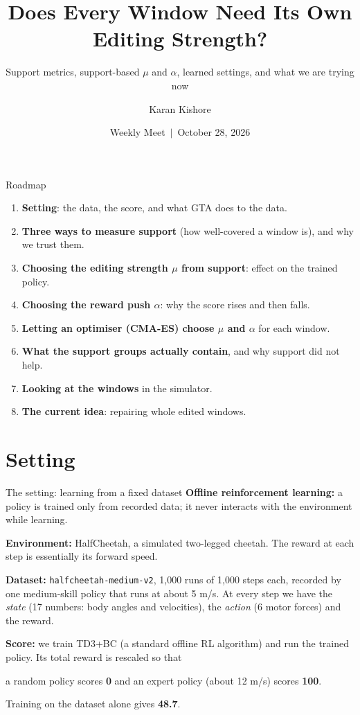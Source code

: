 \documentclass[aspectratio=169,10pt]{beamer}
\title[support metrics $\rightarrow$ per-window $\mu$ and $\alpha$ $\rightarrow$ current idea]{Does Every Window Need Its Own Editing Strength?}
\subtitle{Support metrics, support-based $\mu$ and $\alpha$, learned settings, and what we are trying now}
\author{Karan Kishore}
\institute{IIT Madras}
\date{Weekly Meet \,$|$\, October 28, 2026}
\begin{document}
\begin{frame}
\titlepage
\end{frame}

\begin{frame}{Roadmap}
\begin{enumerate}
\item \textbf{Setting}: the data, the score, and what GTA does to the data.
\item \textbf{Three ways to measure support} (how well-covered a window is), and why we trust them.
\item \textbf{Choosing the editing strength $\mu$ from support}: effect on the trained policy.
\item \textbf{Choosing the reward push $\alpha$}: why the score rises and then falls.
\item \textbf{Letting an optimiser (CMA-ES) choose $\mu$ and $\alpha$} for each window.
\item \textbf{What the support groups actually contain}, and why support did not help.
\item \textbf{Looking at the windows} in the simulator.
\item \textbf{The current idea}: repairing whole edited windows.
\end{enumerate}
\end{frame}

\section{Setting}
\begin{frame}{The setting: learning from a fixed dataset}
\textbf{Offline reinforcement learning:} a policy is trained only from recorded data; it never interacts with the environment while learning.
\vspace{0.5em}

\textbf{Environment:} HalfCheetah, a simulated two-legged cheetah. The reward at each step is essentially its forward speed.
\vspace{0.3em}

\textbf{Dataset:} \texttt{halfcheetah-medium-v2}, 1{,}000 runs of 1{,}000 steps each, recorded by one medium-skill policy that runs at about 5 m/s.
At every step we have the \emph{state} (17 numbers: body angles and velocities), the \emph{action} (6 motor forces) and the reward.
\vspace{0.5em}

\textbf{Score:} we train TD3+BC (a standard offline RL algorithm) and run the trained policy. Its total reward is rescaled so that
\begin{center}
a random policy scores \textbf{0} \qquad and \qquad an expert policy (about 12 m/s) scores \textbf{100}.
\end{center}
Training on the dataset alone gives \textbf{48.7}.
\end{frame}
\end{document}
